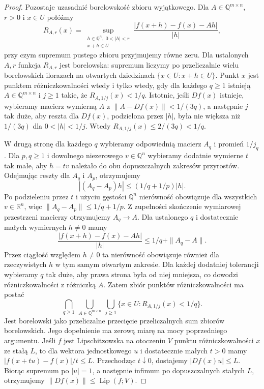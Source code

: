 \begin{proof}
Pozostaje uzasadnić borelowskość zbioru wyjątkowego.
Dla $A\in\mathbb Q^{m\times n}$, $r>0$ i $x\in U$
połóżmy
\[
 R_{A,r}(x)=\sup_{\substack{h\in\mathbb Q^n,\;0<|h|<r\\
                                    x+h\in U}}
 \frac{|f(x+h)-f(x)-Ah|}{|h|},
\]
przy czym supremum pustego zbioru przyjmujemy równe
zeru. Dla ustalonych $A,r$ funkcja $R_{A,r}$ jest
borelowska: supremum liczymy po przeliczalnie wielu
borelowskich ilorazach na otwartych dziedzinach
$\{x\in U:x+h\in U\}$.
Punkt $x$ jest punktem różniczkowalności wtedy i tylko wtedy,
gdy dla każdego $q\ge1$ istnieją
$A\in\mathbb Q^{m\times n}$ i $j\ge1$ takie, że
$R_{A,1/j}(x)<1/q$. Istotnie, jeśli $Df(x)$ istnieje,
wybieramy macierz wymierną $A$ z
$\|A-Df(x)\|<1/(3q)$, a następnie $j$ tak duże,
aby reszta dla $Df(x)$, podzielona przez $|h|$,
była nie większa niż $1/(3q)$ dla $0<|h|<1/j$.
Wtedy $R_{A,1/j}(x)\le2/(3q)<1/q$.

W drugą stronę dla każdego $q$ wybieramy odpowiednią
macierz $A_q$ i promień $1/j_q$. Dla $p,q\ge1$
i dowolnego niezerowego $v\in\mathbb Q^n$ wybieramy
dodatnie wymierne $t$ tak małe, aby $h=tv$ należało
do obu dopuszczalnych zakresów przyrostów. Odejmując
reszty dla $A_q$ i $A_p$, otrzymujemy
\[
 |(A_q-A_p)h|\le (1/q+1/p)|h|.
\]
Po podzieleniu przez $t$ i użyciu gęstości $\mathbb Q^n$
nierówność obowiązuje dla wszystkich $v\in\mathbb R^n$,
więc $\|A_q-A_p\|\le1/q+1/p$. Z zupełności
skończenie wymiarowej przestrzeni macierzy otrzymujemy
$A_q\to A$. Dla ustalonego $q$ i dostatecznie małych
wymiernych $h\ne0$ mamy
\[
 \frac{|f(x+h)-f(x)-Ah|}{|h|}
 \le1/q+\|A_q-A\|.
\]
Przez ciągłość względem $h\ne0$ ta nierówność obowiązuje
również dla rzeczywistych $h$ w tym samym otwartym
zakresie. Dla każdej dodatniej tolerancji wybieramy
$q$ tak duże, aby prawa strona była od niej mniejsza,
co dowodzi różniczkowalności z różniczką $A$.
Zatem zbiór punktów różniczkowalności ma postać
\[
 \bigcap_{q\ge1}\ \bigcup_{A\in\mathbb Q^{m\times n}}
 \ \bigcup_{j\ge1}\{x\in U:R_{A,1/j}(x)<1/q\}.
\]
Jest borelowski jako przeliczalne przecięcie
przeliczalnych sum zbiorów borelowskich. Jego dopełnienie ma zerową
miarę na mocy poprzedniego argumentu.
Jeśli $f$ jest Lipschitzowska na otoczeniu $V$ punktu
różniczkowalności $x$ ze stałą $L$, to dla wektora
jednostkowego $u$ i dostatecznie małych $t>0$
mamy $|f(x+tu)-f(x)|/t\le L$.
Przechodząc $t\downarrow0$, dostajemy
$|Df(x)u|\le L$. Biorąc supremum po $|u|=1$,
a następnie infimum po dopuszczalnych stałych $L$,
otrzymujemy $\|Df(x)\|\le\operatorname{Lip}(f;V)$.
\end{proof}

